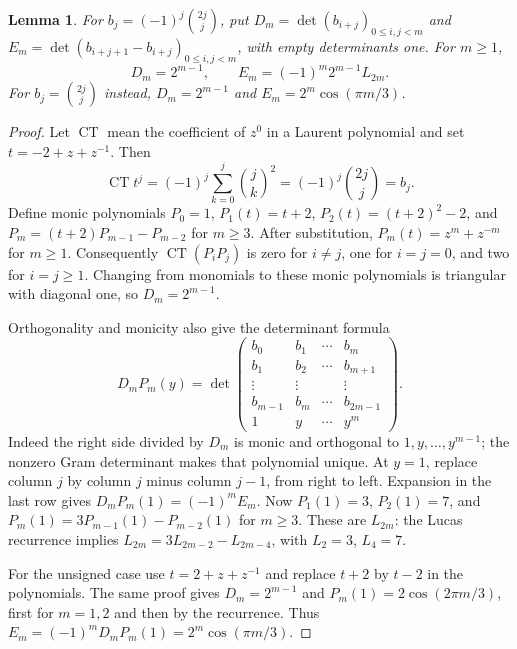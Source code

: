 \documentclass[11pt]{article}
\newtheorem{lemma}[theorem]{Lemma}
\begin{document}
\begin{lemma}\label{lem:moments}
For $b_j=(-1)^j\binom{2j}j$, put
$D_m=\det(b_{i+j})_{0\leq i,j<m}$ and
$E_m=\det(b_{i+j+1}-b_{i+j})_{0\leq i,j<m}$, with empty determinants one.
For $m\geq1$,
\[
 D_m=2^{m-1},\qquad E_m=(-1)^m2^{m-1}L_{2m}.
\]
For $b_j=\binom{2j}j$ instead, $D_m=2^{m-1}$ and
$E_m=2^m\cos(\pi m/3)$.
\end{lemma}
\begin{proof}
Let $\operatorname{CT}$ mean the coefficient of $z^0$ in a Laurent
polynomial and set $t=-2+z+z^{-1}$. Then
\[
 \operatorname{CT}t^j=(-1)^j\sum_{k=0}^j\binom jk^2
 =(-1)^j\binom{2j}j=b_j.
\]
Define monic polynomials $P_0=1$, $P_1(t)=t+2$,
$P_2(t)=(t+2)^2-2$, and
$P_m=(t+2)P_{m-1}-P_{m-2}$ for $m\geq3$.
After substitution, $P_m(t)=z^m+z^{-m}$ for $m\geq1$.
Consequently $\operatorname{CT}(P_iP_j)$ is zero for $i\ne j$,
one for $i=j=0$, and two for $i=j\geq1$.
Changing from monomials to these monic polynomials is triangular with
diagonal one, so $D_m=2^{m-1}$.

Orthogonality and monicity also give the determinant formula
\[
 D_m P_m(y)=\det\begin{pmatrix}
 b_0&b_1&\cdots&b_m\\
 b_1&b_2&\cdots&b_{m+1}\\
 \vdots&\vdots&&\vdots\\
 b_{m-1}&b_m&\cdots&b_{2m-1}\\
 1&y&\cdots&y^m
 \end{pmatrix}.
\]
Indeed the right side divided by $D_m$ is monic and orthogonal to
$1,y,\ldots,y^{m-1}$; the nonzero Gram determinant makes that polynomial
unique. At $y=1$, replace column $j$ by column $j$ minus column $j-1$,
from right to left. Expansion in the last row gives
$D_mP_m(1)=(-1)^mE_m$.
Now $P_1(1)=3$, $P_2(1)=7$, and
$P_m(1)=3P_{m-1}(1)-P_{m-2}(1)$ for $m\geq3$.
These are $L_{2m}$: the Lucas recurrence implies
$L_{2m}=3L_{2m-2}-L_{2m-4}$, with $L_2=3$, $L_4=7$.

For the unsigned case use $t=2+z+z^{-1}$ and replace $t+2$ by $t-2$
in the polynomials. The same proof gives $D_m=2^{m-1}$ and
$P_m(1)=2\cos(2\pi m/3)$, first for $m=1,2$ and then by the recurrence.
Thus $E_m=(-1)^mD_mP_m(1)=2^m\cos(\pi m/3)$.
\end{proof}
\end{document}
